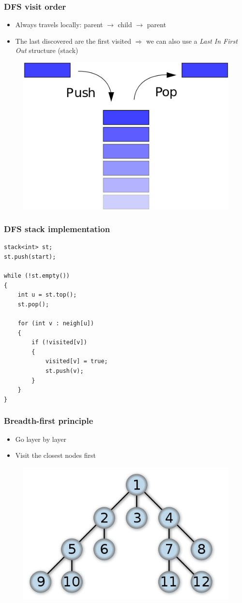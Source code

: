 \documentclass[12pt]{beamer}
\begin{document}
\begin{frame}
\frametitle{DFS visit order}
\begin{itemize}
\item Always travels locally: parent $\to$ child $\to$ parent
\item The last discovered are the first visited $\Rightarrow$ we can also use a \emph{Last In First Out} structure (stack)
\end{itemize}
\begin{figure}
\centering
\includegraphics[width=.5\linewidth]{img/stack}
\end{figure}
\end{frame}

\begin{frame}[fragile]
\frametitle{DFS stack implementation}
\begin{lstlisting}
stack<int> st;
st.push(start);

while (!st.empty())
{
    int u = st.top();
    st.pop();
    
    for (int v : neigh[u])
    {
        if (!visited[v])
        {
            visited[v] = true;
            st.push(v);
        }
    }
}
\end{lstlisting}
\end{frame}

\begin{frame}
\frametitle{Breadth-first principle}
\begin{itemize}
\item Go layer by layer
\item Visit the closest nodes first
\end{itemize}
\begin{figure}
\centering
\includegraphics[width=.5\linewidth]{img/bfs-tree}
\end{figure}
\end{frame}
\end{document}
